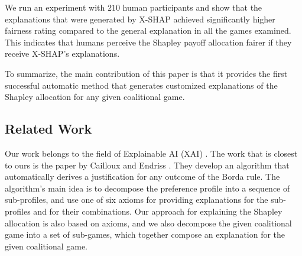 \documentclass[letterpaper]{article} %
\begin{document}
We run an experiment with $210$ human participants and show that %
the explanations that were generated by X-SHAP achieved significantly higher fairness rating compared to the general explanation in all the games examined. This indicates that humans perceive the Shapley payoff allocation fairer if they receive X-SHAP's explanations.

To summarize, the main contribution of this paper is that it provides the first successful automatic method that generates customized explanations of the Shapley allocation for any given coalitional game.



\subsection{Related Work}
Our work belongs to the field of Explainable AI (XAI) \cite{gunning2019xai}. %
%
The work that is closest to ours is the paper by Cailloux and Endriss \cite{Cailloux2016ArguingAV}. 
They %
develop an algorithm that automatically derives a justification for any outcome of the Borda rule. The algorithm's main idea is to decompose the preference profile into a sequence of sub-profiles, and use one of six axioms for providing explanations for the sub-profiles and for their combinations. %
Our approach for explaining the Shapley allocation is also based on axioms, and we also decompose the given coalitional game into a set of sub-games, which together compose an explanation for the given coalitional game.  
\end{document}
